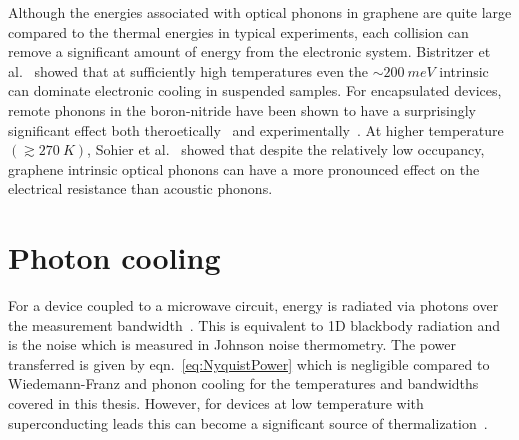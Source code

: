 Although the energies associated with optical phonons in graphene are quite large compared to the thermal energies in typical experiments, each collision can remove a significant amount of energy from the electronic system. Bistritzer et al.~\cite{bistritzer_electronic_2009} showed that at sufficiently high temperatures even the ${\sim200}~meV$ intrinsic can dominate electronic cooling in suspended samples. For encapsulated devices, remote phonons in the boron-nitride have been shown to have a surprisingly significant effect both theroetically~\cite{viljas_electron-phonon_2010, bistritzer_electronic_2009, low_cooling_2012} and experimentally~\cite{tielrooij_out--plane_2017}. At higher temperature $\left( \gtrsim 270~K\right)$, Sohier et al.~\cite{sohier_phonon-limited_2014} showed that despite the relatively low occupancy, graphene intrinsic optical phonons can have a more pronounced effect on the electrical resistance than acoustic phonons.

\section{Photon cooling}
For a device coupled to a microwave circuit, energy is radiated via photons over the measurement bandwidth~\cite{schmidt_photon-mediated_2004, mckitterick_prospects_2015}. This is equivalent to 1D blackbody radiation and is the noise which is measured in Johnson noise thermometry. The power transferred is given by eqn.~\ref{eq:NyquistPower} which is negligible compared to Wiedemann-Franz and phonon cooling for the temperatures and bandwidths covered in this thesis. However, for devices at low temperature with superconducting leads this can become a significant source of thermalization~\cite{mckitterick_prospects_2015}.

